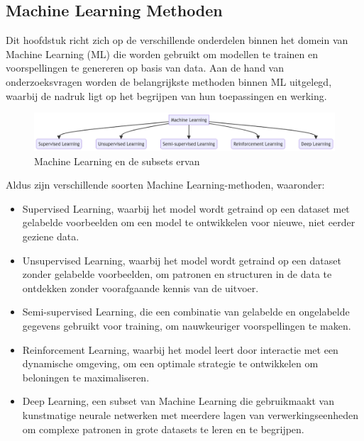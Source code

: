 \subsection{Machine Learning Methoden}

Dit hoofdstuk richt zich op de verschillende onderdelen binnen het domein van Machine Learning (ML) die worden gebruikt om modellen te trainen en voorspellingen te genereren op basis van data. Aan de hand van onderzoeksvragen worden de belangrijkste methoden binnen ML uitgelegd, waarbij de nadruk ligt op het begrijpen van hun toepassingen en werking.

\begin{figure}[h]
    \includegraphics[width=\linewidth]{graphics/mm.png}
    \caption{Machine Learning en de subsets ervan}
    \label{fig:ML_subsets}
\end{figure}

Aldus \textcite{Mahesh2019} zijn verschillende soorten Machine Learning-methoden, waaronder:

\begin{itemize}
    \item Supervised Learning, waarbij het model wordt getraind op een dataset met gelabelde voorbeelden om een model te ontwikkelen voor nieuwe, niet eerder geziene data.

    \item Unsupervised Learning, waarbij het model wordt getraind op een dataset zonder gelabelde voorbeelden, om patronen en structuren in de data te ontdekken zonder voorafgaande kennis van de uitvoer.

    \item Semi-supervised Learning, die een combinatie van gelabelde en ongelabelde gegevens gebruikt voor training, om nauwkeuriger voorspellingen te maken.

    \item Reinforcement Learning, waarbij het model leert door interactie met een dynamische omgeving, om een optimale strategie te ontwikkelen om beloningen te maximaliseren.

    \item Deep Learning, een subset van Machine Learning die gebruikmaakt van kunstmatige neurale netwerken met meerdere lagen van verwerkingseenheden om complexe patronen in grote datasets te leren en te begrijpen.
\end{itemize}

